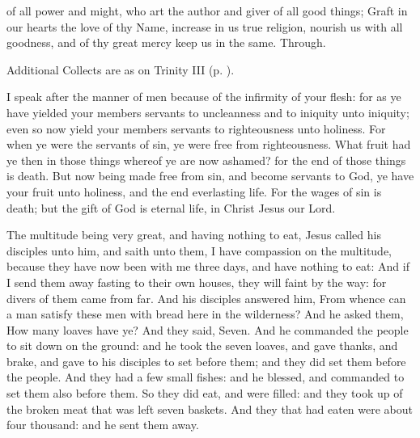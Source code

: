 \collect
{} of all power and might, who art the author and giver of all good things; Graft in our hearts the love of thy Name, increase in us true religion, nourish us with all goodness, and of thy great mercy keep us in the same. Through.

\begin{rubric}
    Additional Collects are as on Trinity III (p. \pageref{TrinityIII}).
\end{rubric}

 I speak after the manner of men because of the infirmity of your flesh: for as ye have yielded your members servants to uncleanness and to iniquity unto iniquity; even so now yield your members servants to righteousness unto holiness. For when ye were the servants of sin, ye were free from righteousness. What fruit had ye then in those things whereof ye are now ashamed? for the end of those things is death. But now being made free from sin, and become servants to God, ye have your fruit unto holiness, and the end everlasting life. For the wages of sin is death; but the gift of God is eternal life, in Christ Jesus our Lord.


 The multitude being very great, and having nothing to eat, Jesus called his disciples unto him, and saith unto them, I have compassion on the multitude, because they have now been with me three days, and have nothing to eat: And if I send them away fasting to their own houses, they will faint by the way: for divers of them came from far. And his disciples answered him, From whence can a man satisfy these men with bread here in the wilderness? And he asked them, How many loaves have ye? And they said, Seven. And he commanded the people to sit down on the ground: and he took the seven loaves, and gave thanks, and brake, and gave to his disciples to set before them; and they did set them before the people. And they had a few small fishes: and he blessed, and commanded to set them also before them. So they did eat, and were filled: and they took up of the broken meat that was left seven baskets. And they that had eaten were about four thousand: and he sent them away.

